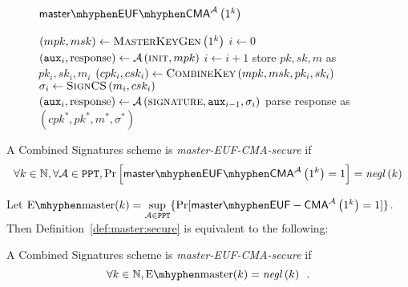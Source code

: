   \begin{figure}[!htbp]
    \begin{gamebox}{$\mathsf{master \mhyphen EUF \mhyphen
    CMA}^{\adversary}\left(1^k\right)$}
      \begin{algorithmic}[1]
        \State $\left(mpk, msk\right) \gets
        \textsc{MasterKeyGen}\left(1^k\right)$
        \State $i \gets 0$
        \State $\left(\mathtt{aux}_i, \mathrm{response}\right) \gets
        \mathcal{A}\left(\textsc{init}, mpk\right)$
          \State $i \gets i + 1$
          \State store $pk, sk, m$ as $pk_i, sk_i, m_i$
          \State $\left(cpk_i, csk_i\right) \gets
          \textsc{CombineKey}\left(mpk, msk, pk_i, sk_i\right)$
          \State $\sigma_i \gets \textsc{SignCS}\left(m_i, csk_i\right)$
          \State $\left(\mathtt{aux}_i, \mathrm{response}\right) \gets
          \mathcal{A}\left(\textsc{signature}, \mathtt{aux}_{i-1},
          \sigma_i\right)$
        \EndWhile
        \State parse response as $\left(cpk^*, pk^*, m^*, \sigma^*\right)$
          \State {}
        \Else
          \State {}
        \EndIf
      \end{algorithmic}
    \end{gamebox}
    \caption{}
    \label{game:comb:master}
  \end{figure}
  \begin{definition}
    \label{def:master:secure}
    A Combined Signatures scheme is \emph{\textsf{master-EUF-CMA}-secure} if
    \begin{equation*}
      \forall k \in \mathbb{N}, \forall \adversary \in \mathtt{PPT},
      \Pr\left[\mathsf{master \mhyphen EUF \mhyphen
      CMA}^{\adversary}\left(1^k\right) = 1\right] =
      \mathit{negl}\left(k\right)
    \end{equation*}
  \end{definition}

  Let $\mathrm{E \mhyphen master}(k) = \underset{\adversary \in
  \mathtt{PPT}}{\sup}\{\Pr[\mathsf{master \mhyphen
  EUF-CMA}^{\adversary}\left(1^k\right) = 1]\}$. Then
  Definition~\ref{def:master:secure} is equivalent to the following:

  \begin{definition}
    \label{def:master:secure:sup}
    A Combined Signatures scheme is \emph{\textsf{master-EUF-CMA}-secure} if
    \begin{equation*}
      \forall k \in \mathbb{N}, \mathrm{E \mhyphen master}(k) =
      \mathit{negl}\left(k\right) \enspace.
    \end{equation*}
  \end{definition}

